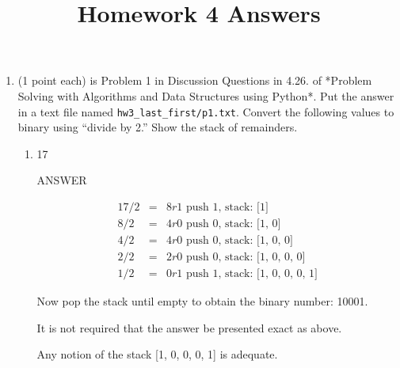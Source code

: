 \documentclass{article} %
\title{Homework 4 Answers}
\author{}
\begin{document}
\maketitle

\renewcommand{\labelenumi}{Problem \arabic{enumi}}

\renewcommand{\labelenumii}{\alph{enumii})}


\begin{enumerate}

\item (1 point each) is Problem 1 in Discussion Questions in 4.26.  of
  *Problem Solving with Algorithms and Data Structures using Python*.
  Put the answer in a text file named \verb|hw3_last_first/p1.txt|.
  Convert the following values to binary using “divide by 2.” Show the
  stack of remainders.


  \begin{enumerate}
  \item
      17

      \begin{minipage}{4.5in}
        
        \vspace{0.1in}
        ANSWER
        
        \begin{eqnarray*}
          17 / 2 &=& 8 r 1 \text{ push 1, stack: [1]} \\
          8 / 2  &=& 4 r 0 \text{ push 0, stack: [1, 0]} \\
          4 / 2  &=& 4 r 0 \text{ push 0, stack: [1, 0, 0]} \\
          2 / 2  &=& 2 r 0 \text{ push 0, stack: [1, 0, 0, 0]} \\
          1 / 2  &=& 0 r 1 \text{ push 1, stack: [1, 0, 0, 0, 1]} 
        \end{eqnarray*}

        Now pop the stack until empty to obtain the binary number: 10001.

        It is not required that the answer be presented exact as above.

        Any notion of the stack [1, 0, 0, 0, 1] is adequate.
        \vspace{.1in}

      \end{minipage}


\end{enumerate}
\end{enumerate}
\end{document}
